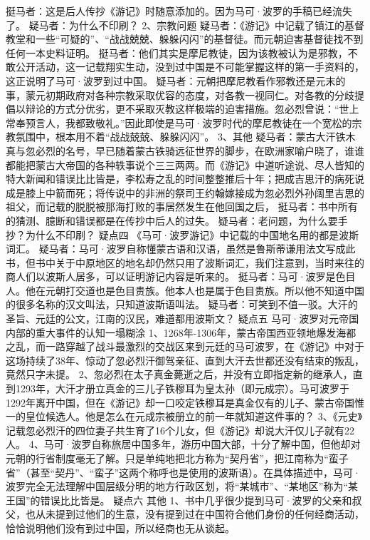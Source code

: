\documentclass[12pt,UTF8]{ctexbook}
\begin{document}
挺马者：这是后人传抄《游记》时随意添加的。因为马可·波罗的手稿已经流失了。
疑马者：为什么不印刷？
2、宗教问题
疑马者：《游记》中记载了镇江的基督教堂和一些“可疑的”、“战战兢兢、躲躲闪闪”的基督徒。而元朝迫害基督徒找不到任何一本史料证明。
挺马者：他们其实是摩尼教徒，因为该教被认为是邪教，不敢公开活动，这一记载翔实生动，没到过中国是不可能掌握这样的第一手资料的，这正说明了马可·波罗到过中国。
疑马者：元朝把摩尼教看作邪教还是元末的事，蒙元初期政府对各种宗教采取优容的态度，对各教一视同仁。对各教的分歧提倡以辩论的方式分优劣，更不采取灭教这样极端的迫害措施。忽必烈曾说：“世上常奉预言人，我都致敬礼。”因此即使是马可·波罗时代的摩尼教徒在一个宽松的宗教氛围中，根本用不着“战战兢兢、躲躲闪闪”。
3、其他
疑马者：蒙古大汗铁木真与忽必烈的名号，早已随着蒙古铁骑远征世界的脚步，在欧洲家喻户晓了，谁谁都能把蒙古大帝国的各种轶事说个三三两两。而《游记》中道听途说、尽人皆知的特大新闻和错误比比皆是，李松寿之乱的时间整整推后十年；把成吉思汗的病死说成是膝上中箭而死；将传说中的非洲的祭司王约翰嫁接成为忽必烈外孙阔里吉思的祖父，而记载的脱脱被那海打败的事居然发生在他回国之后，
挺马者：书中所有的猜测、臆断和错误都是在传抄中后人的过失。
疑马者：老问题，为什么要手抄？为什么不印刷？
疑点四
《马可·波罗游记》中记载的中国地名用的都是波斯词汇。
疑马者：马可·波罗自称懂蒙古语和汉语，虽然是鲁斯蒂谦用法文写成此书，但书中关于中原地区的地名却仍然只用了波斯词汇，我们注意到，当时来往的商人们以波斯人居多，可以证明游记内容是听来的。
挺马者：马可·波罗是色目人。他在元朝打交道也是色目贵族。他本人也是属于色目贵族。所以他不知道中国的很多名称的汉文叫法，只知道波斯语叫法。
疑马者：可笑到不值一驳。大汗的圣旨、元廷的公文，江南的汉民，难道都用波斯文？
疑点五
马可·波罗对元帝国内部的重大事件的认知一塌糊涂
1、1268年-1306年，蒙古帝国西亚领地爆发海都之乱，而一路穿越了战斗最激烈的交战区来到元廷的马可波罗，在《游记》中对于这场持续了38年、惊动了忽必烈汗御驾亲征、直到大汗去世都还没有结束的叛乱，竟然只字未提。
2、忽必烈在太子真金薨逝之后，并没有立即指定新的继承人，直到1293年，大汗才册立真金的三儿子铁穆耳为皇太孙（即元成宗）。马可波罗于1292年离开中国，但在《游记》却一口咬定铁穆耳是真金仅有的儿子、蒙古帝国惟一的皇位候选人。他是怎么在元成宗被册立的前一年就知道这件事的？
3、《元史》记载忽必烈汗的四位妻子共生育了16个儿女，但《游记》却说大汗仅儿子就有22人。
4、马可·波罗自称旅居中国多年，游历中国大部，十分了解中国，但他却对元朝的行省制度毫无了解。只是单纯地把北方称为“契丹省”，把江南称为“蛮子省”（甚至“契丹”、“蛮子”这两个称呼也是使用的波斯语）。在具体描述中，马可·波罗完全无法理解中国层级分明的地方行政区划，将“某城市”、“某地区”称为“某王国”的错误比比皆是。
疑点六
其他
1、书中几乎很少提到马可·波罗的父亲和叔父，也从未提到过他们的生意，没有提到过在中国符合他们身份的任何经商活动，恰恰说明他们没有到过中国，所以经商也无从谈起。
\end{document}

